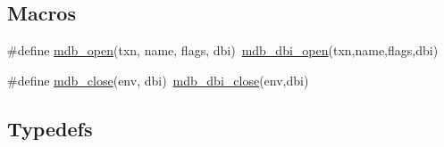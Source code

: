 \subsection*{Macros}
\begin{DoxyCompactItemize}
\item 
\#define \mbox{\hyperlink{group__mdb_gab69d2d8eea05c0eb11cdb7a1916727bd}{mdb\+\_\+open}}(txn,  name,  flags,  dbi)~\mbox{\hyperlink{group__internal_gac08cad5b096925642ca359a6d6f0562a}{mdb\+\_\+dbi\+\_\+open}}(txn,name,flags,dbi)
\item 
\#define \mbox{\hyperlink{group__mdb_gac56dd5b9c0cecaee35d3d6719939212a}{mdb\+\_\+close}}(env,  dbi)~\mbox{\hyperlink{group__internal_ga52dd98d0c542378370cd6b712ff961b5}{mdb\+\_\+dbi\+\_\+close}}(env,dbi)
\end{DoxyCompactItemize}
\subsection*{Typedefs}
